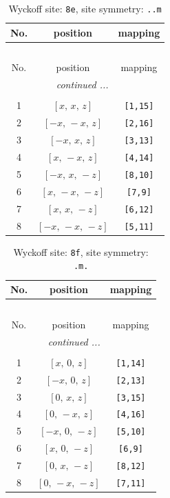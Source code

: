 \documentclass[fleqn,8pt]{jsarticle}
\begin{document}
\begin{longtable}{ccc}
\caption{Wyckoff site: {\tt 8e}, site symmetry: {\tt ..m}}
 \\
 \hline \hline
No. & position & mapping \\ \hline \endfirsthead

\multicolumn{2}{l}{\tablename\ \thetable{}} \\
 \hline \hline
No. & position & mapping \\ \hline \endhead

 \hline \hline
\multicolumn{2}{r}{\footnotesize\it continued ...} \\ \endfoot

 \hline \hline
\multicolumn{2}{r}{} \\ \endlastfoot

1 & $\left[ x,\, x,\, z \right]$ & {\tt [1,15]} \\ \hline
2 & $\left[ - x,\, - x,\, z \right]$ & {\tt [2,16]} \\ \hline
3 & $\left[ - x,\, x,\, z \right]$ & {\tt [3,13]} \\ \hline
4 & $\left[ x,\, - x,\, z \right]$ & {\tt [4,14]} \\ \hline
5 & $\left[ - x,\, x,\, - z \right]$ & {\tt [8,10]} \\ \hline
6 & $\left[ x,\, - x,\, - z \right]$ & {\tt [7,9]} \\ \hline
7 & $\left[ x,\, x,\, - z \right]$ & {\tt [6,12]} \\ \hline
8 & $\left[ - x,\, - x,\, - z \right]$ & {\tt [5,11]} \\
\end{longtable}
\renewcommand{\arraystretch}{1.2}
\begin{longtable}{ccc}
\caption{Wyckoff site: {\tt 8f}, site symmetry: {\tt .m.}}
 \\
 \hline \hline
No. & position & mapping \\ \hline \endfirsthead

\multicolumn{2}{l}{\tablename\ \thetable{}} \\
 \hline \hline
No. & position & mapping \\ \hline \endhead

 \hline \hline
\multicolumn{2}{r}{\footnotesize\it continued ...} \\ \endfoot

 \hline \hline
\multicolumn{2}{r}{} \\ \endlastfoot

1 & $\left[ x,\, 0,\, z \right]$ & {\tt [1,14]} \\ \hline
2 & $\left[ - x,\, 0,\, z \right]$ & {\tt [2,13]} \\ \hline
3 & $\left[ 0,\, x,\, z \right]$ & {\tt [3,15]} \\ \hline
4 & $\left[ 0,\, - x,\, z \right]$ & {\tt [4,16]} \\ \hline
5 & $\left[ - x,\, 0,\, - z \right]$ & {\tt [5,10]} \\ \hline
6 & $\left[ x,\, 0,\, - z \right]$ & {\tt [6,9]} \\ \hline
7 & $\left[ 0,\, x,\, - z \right]$ & {\tt [8,12]} \\ \hline
8 & $\left[ 0,\, - x,\, - z \right]$ & {\tt [7,11]} \\
\end{longtable}
\end{document}
